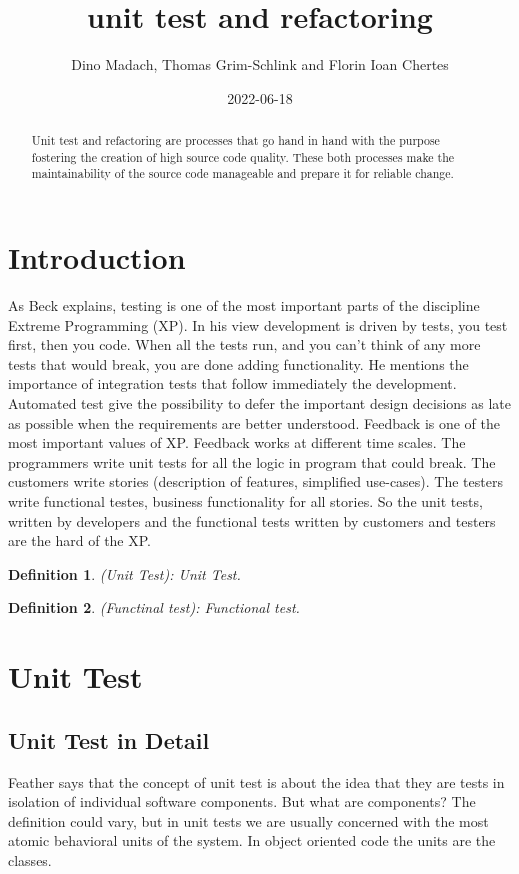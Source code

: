 \documentclass{article}
\title{unit test and refactoring}
\date{2022-06-18}
\author{Dino Madach, Thomas Grim-Schlink and Florin Ioan Chertes}
\newtheorem{definition}{Definition}
\begin{document}
\maketitle
{}
\newpage
{}


\begin{abstract}
Unit test and refactoring are processes that go hand in hand with the purpose fostering the creation of high source code quality. These both processes make the maintainability of the source code manageable and prepare it for reliable change.
\end{abstract}

\section{Introduction}

As Beck \cite{BecAnd04extreme, beck2001planning} explains, testing is one of the most important parts of the discipline Extreme Programming (XP). In his view development is driven by tests, you test first, then you code. When all the tests run, and you can't think of any more tests that would break, you are done adding functionality. He mentions the importance of integration tests that follow immediately the development. Automated test give the possibility to defer the important design decisions as late as possible when the requirements are better understood. Feedback is one of the most important values of XP. Feedback works at different time scales. The programmers write unit tests for all the logic in program that could break. The customers write stories (description of features, simplified use-cases). The testers write functional testes, business functionality for all stories. So the unit tests, written by developers and the functional tests written by customers and testers are the hard of the XP.   

\begin{definition}
   (Unit Test): Unit Test.
\end{definition}

\begin{definition}
  (Functinal test): Functional test.
\end{definition}


\section{Unit Test}

\subsection{Unit Test in Detail}
Feather \cite{FeathersMichael} says that the concept of unit test is about the idea that they are tests in isolation of individual software components. But what are components? The definition could vary, but in unit tests we are usually concerned with the most atomic behavioral units of the system. In object oriented code the units are the classes.
\end{document}
